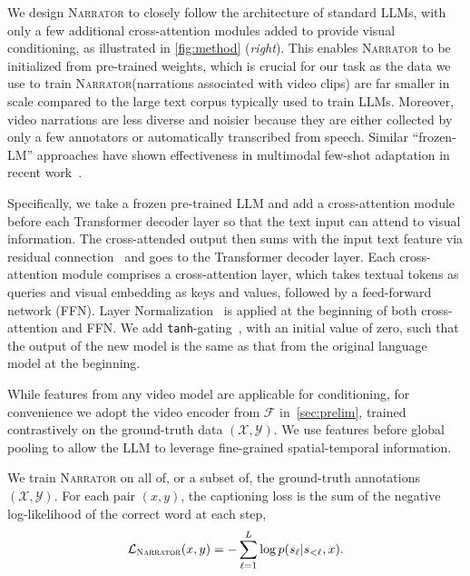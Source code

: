 \documentclass[10pt,twocolumn,letterpaper]{article}
\newcommand{\calX}{\mathcal{X}}
\newcommand{\calY}{\mathcal{Y}}
\newcommand{\myparagraph}[1]{\vspace{0pt}\noindent{\bf #1}}
\newcommand{\narrator}{\textsc{Narrator}\xspace}
\begin{document}
\myparagraph{Architecture.}
We design \narrator to closely follow the architecture of standard LLMs, with only a few additional cross-attention modules added to provide visual conditioning, as illustrated in \cref{fig:method} ({\em right}).
This enables \narrator to be initialized from pre-trained weights, which is crucial for our task as the data we use to train \narrator (narrations associated with video clips) are far smaller in scale
compared to the large text corpus typically used to train LLMs. Moreover, video narrations are less diverse and noisier because they are either collected by only a few annotators or automatically transcribed from speech.
Similar ``frozen-LM'' approaches have shown effectiveness in
multimodal few-shot adaptation in recent work~\cite{tsimpoukelli2021multimodal,alayrac2022flamingo}.

Specifically, we take a frozen pre-trained LLM and add a cross-attention module before each Transformer decoder layer so that the text input can attend to visual information.
The cross-attended output then sums with the input text feature via residual connection~\cite{he2016resnet} and goes to the Transformer decoder layer.
Each cross-attention module comprises a cross-attention layer,
which takes textual tokens as queries and visual embedding as keys and values, followed by a feed-forward network (FFN).
Layer Normalization~\cite{ba2016layernorm} is applied at the beginning of both cross-attention and FFN.
We add {\tt tanh}-gating~\cite{hochreiter1997lstm}, with an initial value of zero, such that the output of the new model is the same as that from the original language model at the beginning.

While features from any video model are applicable for conditioning, for convenience we adopt the video encoder from $\mathcal{F}$ in~\cref{sec:prelim}, trained
contrastively on the ground-truth data $(\calX, \calY)$. We use features before global pooling to allow the LLM to leverage fine-grained spatial-temporal information.


\myparagraph{Training.}
We train \narrator on all of, or a subset of, the ground-truth annotations $(\calX, \calY)$.
For each pair $(x, y)$, the captioning loss is the sum of the negative log-likelihood of the correct word at each step,
{\small
\begin{align}
	\mathcal{L}_\mathrm{\narrator} (x, y) = -\sum_{\ell=1}^L \log p(s_\ell | s_{<\ell}, x).
\end{align}
}
\end{document}
